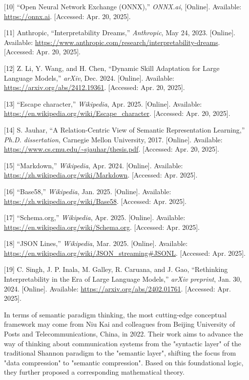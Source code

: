 \documentclass[conference]{IEEEtran}
\begin{document}
{[}10{]} ``Open Neural Network Exchange (ONNX),'' \emph{ONNX.ai},
{[}Online{]}. Available: \url{https://onnx.ai}. {[}Accessed: Apr. 20,
2025{]}.

{[}11{]} Anthropic, ``Interpretability Dreams,'' \emph{Anthropic}, May
24, 2023. {[}Online{]}. Available:
\url{https://www.anthropic.com/research/interpretability-dreams}.
{[}Accessed: Apr. 20, 2025{]}.

{[}12{]} Z. Li, Y. Wang, and H. Chen, ``Dynamic Skill Adaptation for
Large Language Models,'' \emph{arXiv}, Dec. 2024. {[}Online{]}.
Available: \url{https://arxiv.org/abs/2412.19361}. {[}Accessed: Apr. 20,
2025{]}.

{[}13{]} ``Escape character,'' \emph{Wikipedia}, Apr. 2025.
{[}Online{]}. Available:
\url{https://en.wikipedia.org/wiki/Escape_character}. {[}Accessed: Apr.
20, 2025{]}.

{[}14{]} S. Jauhar, ``A Relation-Centric View of Semantic Representation
Learning,'' \emph{Ph.D. dissertation}, Carnegie Mellon University, 2017.
{[}Online{]}. Available:
\url{https://www.cs.cmu.edu/~sjauhar/thesis.pdf}. {[}Accessed: Apr. 20,
2025{]}.

{[}15{]} ``Markdown,'' \emph{Wikipedia}, Apr. 2024. {[}Online{]}.
Available: \url{https://zh.wikipedia.org/wiki/Markdown}. {[}Accessed:
Apr. 2025{]}.

{[}16{]} ``Base58,'' \emph{Wikipedia}, Jan. 2025. {[}Online{]}.
Available: \url{https://zh.wikipedia.org/wiki/Base58}. {[}Accessed: Apr.
2025{]}.

{[}17{]} ``Schema.org,'' \emph{Wikipedia}, Apr. 2025. {[}Online{]}.
Available: \url{https://en.wikipedia.org/wiki/Schema.org}. {[}Accessed:
Apr. 2025{]}.

{[}18{]} ``JSON Lines,'' \emph{Wikipedia}, Mar. 2025. {[}Online{]}.
Available: \url{https://en.wikipedia.org/wiki/JSON_streaming\#JSONL}.
{[}Accessed: Apr. 2025{]}.

{[}19{]} C. Singh, J. P. Inala, M. Galley, R. Caruana, and J. Gao,
``Rethinking Interpretability in the Era of Large Language Models,''
\emph{arXiv preprint}, Jan. 30, 2024. {[}Online{]}. Available:
\url{https://arxiv.org/abs/2402.01761}. {[}Accessed: Apr. 2025{]}.

In terms of semantic paradigm thinking, the most cutting-edge conceptual
framework may come from Niu Kai and colleagues from Beijing University
of Posts and Telecommunications, China, in 2022. Their work aims to
advance the way of thinking about communication systems from the
"syntactic layer" of the traditional Shannon paradigm to the "semantic
layer", shifting the focus from "data compression" to "semantic
compression". Based on this foundational logic, they further proposed a
corresponding mathematical theory.
\end{document}

